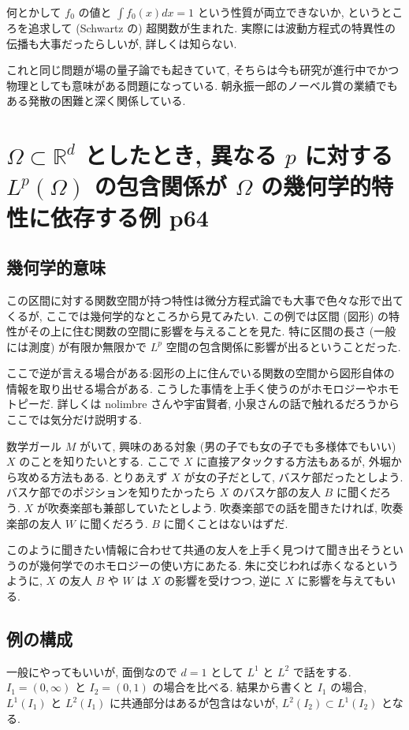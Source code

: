 \documentclass[openany, a4paper, oneside]{jsbook}
\begin{document}
何とかして $f_0$ の値と $\int f_0 (x) dx = 1$ という性質が両立できないか, というところを追求して (Schwartz の) 超関数が生まれた.
実際には波動方程式の特異性の伝播も大事だったらしいが, 詳しくは知らない.

これと同じ問題が場の量子論でも起きていて, そちらは今も研究が進行中でかつ物理としても意味がある問題になっている.
朝永振一郎のノーベル賞の業績でもある発散の困難と深く関係している.
\section{$\Omega \subset \mathbb{R}^d$ としたとき, 異なる $p$ に対する $L^p (\Omega)$ の包含関係が $\Omega$ の幾何学的特性に依存する例 \cite{DavidWilliams1} p64}

\subsection{幾何学的意味}

この区間に対する関数空間が持つ特性は微分方程式論でも大事で色々な形で出てくるが, ここでは幾何学的なところから見てみたい.
この例では区間 (図形) の特性がその上に住む関数の空間に影響を与えることを見た.
特に区間の長さ (一般には測度) が有限か無限かで $L^p$ 空間の包含関係に影響が出るということだった.

ここで逆が言える場合がある:図形の上に住んでいる関数の空間から図形自体の情報を取り出せる場合がある.
こうした事情を上手く使うのがホモロジーやホモトピーだ.
詳しくは nolimbre さんや宇宙賢者, 小泉さんの話で触れるだろうからここでは気分だけ説明する.

数学ガール $M$ がいて, 興味のある対象 (男の子でも女の子でも多様体でもいい) $X$ のことを知りたいとする.
ここで $X$ に直接アタックする方法もあるが, 外堀から攻める方法もある.
とりあえず $X$ が女の子だとして, バスケ部だったとしよう.
バスケ部でのポジションを知りたかったら $X$ のバスケ部の友人 $B$ に聞くだろう.
$X$ が吹奏楽部も兼部していたとしよう.
吹奏楽部での話を聞きたければ, 吹奏楽部の友人 $W$ に聞くだろう.
$B$ に聞くことはないはずだ.

このように聞きたい情報に合わせて共通の友人を上手く見つけて聞き出そうというのが幾何学でのホモロジーの使い方にあたる.
朱に交じわれば赤くなるというように, $X$ の友人 $B$ や $W$ は $X$ の影響を受けつつ, 逆に $X$ に影響を与えてもいる.
\subsection{例の構成}

一般にやってもいいが, 面倒なので $d = 1$ として $L^1$ と $L^2$ で話をする.
$I_1 = (0, \infty)$ と $I_2 = (0, 1)$ の場合を比べる.
結果から書くと $I_1$ の場合, $L^1 (I_1)$ と $L^2 (I_1)$ に共通部分はあるが包含はないが, $L^2 (I_2) \subset L^1 (I_2)$ となる.
\end{document}
